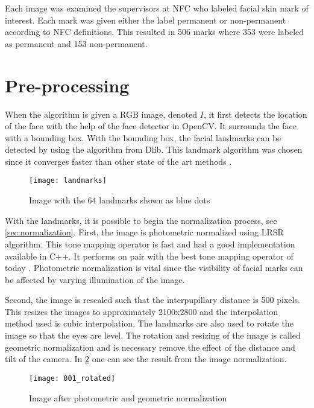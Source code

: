 Each image was examined the supervisors at NFC who labeled facial skin mark of interest. Each mark was given either the label permanent or non-permanent according to NFC definitions. This resulted in 506 marks where 353 were labeled as permanent and 153 non-permanent. 

\section{Pre-processing}

When the algorithm is given a RGB image, denoted $I$, it first detects the location of the face with the help of the face detector in OpenCV. It surrounds the face with a bounding box. With the bounding box, the facial landmarks can be detected by using the algorithm from Dlib. This landmark algorithm was chosen since it converges faster than other state of the art methods \cite{dlib_landmark}. 

\FloatBarrier
\begin{figure}[!h]
	\centering
	\texttt{[image: landmarks]}
	\caption{Image with the 64 landmarks shown as blue dots \label{fig:landmarks}}
\end{figure}
\FloatBarrier

With the landmarks, it is possible to begin the normalization process, see \cref{sec:normalization}. First, the image is photometric normalized using LRSR algorithm. This tone mapping operator is fast and had a good implementation available in C++. It performs on pair with the best tone mapping operator of today \cite{badger}. Photometric normalization is vital since the visibility of facial marks can be affected by varying illumination of the image.  

Second, the image is rescaled such that the interpupillary distance is 500 pixels. This resizes the images to approximately 2100x2800 and the interpolation method used is cubic interpolation. The landmarks are also used to rotate the image so that the eyes are level. The rotation and resizing of the image is called geometric normalization and is necessary remove the effect of the distance and tilt of the camera. In \cref{fig:rotated_img} one can see the result from the image normalization. 

\FloatBarrier
\begin{figure}[!h]
	\centering
	\texttt{[image: 001\_rotated]}
	\caption{Image after photometric and geometric normalization \label{fig:rotated_img}}
\end{figure}
\FloatBarrier

